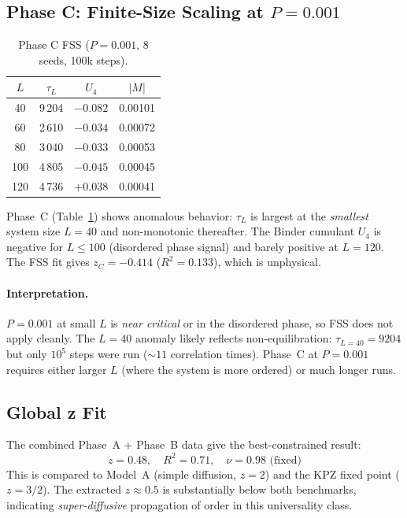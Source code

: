\documentclass[12pt,a4paper]{article}
\begin{document}
\subsection{Phase C: Finite-Size Scaling at $P=0.001$}

\begin{table}[h]
\centering
\caption{Phase C FSS ($P=0.001$, 8 seeds, 100k steps).}
\begin{tabular}{cccc}
\toprule
$L$ & $\tau_L$ & $U_4$ & $|M|$ \\
\midrule
40  & 9\,204 & $-0.082$ & 0.00101 \\
60  & 2\,610 & $-0.034$ & 0.00072 \\
80  & 3\,040 & $-0.033$ & 0.00053 \\
100 & 4\,805 & $-0.045$ & 0.00045 \\
120 & 4\,736 &  $+0.038$ & 0.00041 \\
\bottomrule
\end{tabular}
\label{tab:phaseC}
\end{table}

Phase~C (Table~\ref{tab:phaseC}) shows anomalous behavior: $\tau_L$ is largest at the
\emph{smallest} system size $L=40$ and non-monotonic thereafter.  The Binder cumulant
$U_4$ is negative for $L \leq 100$ (disordered phase signal) and barely positive at
$L=120$.  The FSS fit gives $z_C = -0.414$ ($R^2 = 0.133$), which is unphysical.

\paragraph{Interpretation.} $P=0.001$ at small $L$ is \emph{near critical} or in the
disordered phase, so FSS does not apply cleanly.  The $L=40$ anomaly likely reflects
non-equilibration: $\tau_{L=40} = 9204$ but only $10^5$ steps were run ($\sim 11$
correlation times).  Phase~C at $P=0.001$ requires either larger $L$ (where the system
is more ordered) or much longer runs.

\subsection{Global z Fit}

The combined Phase~A + Phase~B data give the best-constrained result:
\begin{equation}
  \boxed{z = 0.48, \quad R^2 = 0.71, \quad \nu = 0.98 \text{ (fixed)}}
  \label{eq:zmain}
\end{equation}
This is compared to Model~A (simple diffusion, $z=2$) and the KPZ fixed point
($z = 3/2$).  The extracted $z \approx 0.5$ is substantially below both benchmarks,
indicating \emph{super-diffusive} propagation of order in this universality class.
\end{document}
